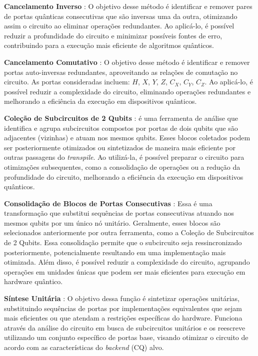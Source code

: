 \textbf{Cancelamento Inverso} \cite{IBM2025_CancelInverso}: O objetivo desse m\'{e}todo \'{e} identificar e remover pares de portas qu\^{a}nticas consecutivas que s\~{a}o inversas uma da outra, otimizando assim o circuito ao eliminar operaç\~{o}es redundantes. Ao aplic\'{a}-lo, \'{e} poss\'{i}vel reduzir a profundidade do circuito e minimizar poss\'{i}veis fontes de erro, contribuindo para a execuç\~{a}o mais eficiente de algoritmos qu\^{a}nticos.

\textbf{Cancelamento Comutativo }\cite{IBM2025_CancelComutativo}: O objetivo desse m\'{e}todo \'{e} identificar e remover portas auto-inversas redundantes, aproveitando as relaç\~{o}es de comutaç\~{a}o no circuito. As portas consideradas incluem: $H$, $X$, $Y$, $Z$, $C_X$, $C_Y$, $C_Z$. Ao aplic\'{a}-lo, \'{e} poss\'{i}vel reduzir a complexidade do circuito, eliminando operaç\~{o}es redundantes e melhorando a efici\^{e}ncia da execuç\~{a}o em dispositivos qu\^{a}nticos.

\textbf{Coleç\~{a}o de Subcircuitos de 2 Qubits} \cite{IBM2025_ColetaBlock2qb}: \'{e} uma ferramenta de an\'{a}lise que identifica e agrupa subcircuitos compostos por portas de dois qubits que s\~{a}o adjacentes (vizinhas) e atuam nos mesmos qubits. Esses blocos coletados podem ser posteriormente otimizados ou sintetizados de maneira mais eficiente por outras passagens do \textit{transpile}. Ao utiliz\'{a}-la, \'{e} poss\'{i}vel preparar o circuito para otimizaç\~{o}es subsequentes, como a consolidaç\~{a}o de operaç\~{o}es ou a reduç\~{a}o da profundidade do circuito, melhorando a efici\^{e}ncia da execuç\~{a}o em dispositivos qu\^{a}nticos.

\textbf{Consolidaç\~{a}o de Blocos de Portas Consecutivas} \cite{IBM2025_ConsolidaBlocos}: Essa \'{e} uma transformaç\~{a}o que substitui sequ\^{e}ncias de portas consecutivas atuando nos mesmos qubits por um \'{u}nico nó unit\'{a}rio. Geralmente, esses blocos s\~{a}o selecionados anteriormente por outra ferramenta, como a Coleç\~{a}o de Subcircuitos de 2 Qubits. Essa consolidaç\~{a}o permite que o subcircuito seja ressincronizado posteriormente, potencialmente resultando em uma implementaç\~{a}o mais otimizada. Al\'{e}m disso, \'{e} poss\'{i}vel reduzir a complexidade do circuito, agrupando operaç\~{o}es em unidades \'{u}nicas que podem ser mais eficientes para execuç\~{a}o em hardware qu\^{a}ntico.

\textbf{S\'{i}ntese Unit\'{a}ria} \cite{IBM2025_SinteseUnit}: O objetivo dessa funç\~{a}o \'{e} sintetizar operaç\~{o}es unit\'{a}rias, substituindo sequ\^{e}ncias de portas por implementaç\~{o}es equivalentes que sejam mais eficientes ou que atendam a restriç\~{o}es espec\'{i}ficas do hardware. Funciona atrav\'{e}s da an\'{a}lise do circuito em busca de subcircuitos unit\'{a}rios e os reescreve utilizando um conjunto espec\'{i}fico de portas base, visando otimizar o circuito de acordo com as caracter\'{i}sticas do \textit{backend} (CQ) alvo.

